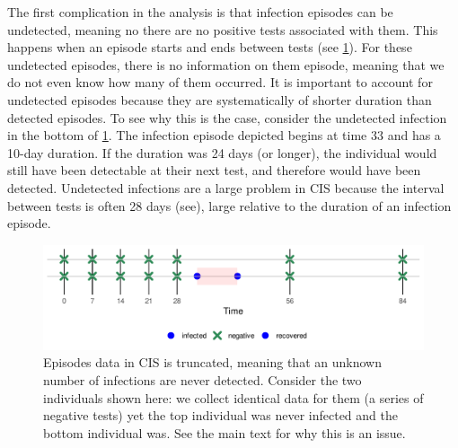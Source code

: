 \documentclass[thesis.tex]{subfiles}
\begin{document}
The first complication in the analysis is that infection episodes can be undetected, meaning no there are no positive tests associated with them.
This happens when an episode starts and ends between tests (see \cref{perf-test:fig:truncation}).
For these undetected episodes, there is no information on them episode, meaning that we do not even know how many of them occurred.
It is important to account for undetected episodes because they are systematically of shorter duration than detected episodes.
To see why this is the case, consider the undetected infection in the bottom of \cref{perf-test:fig:truncation}.
The infection episode depicted begins at time 33 and has a 10-day duration.
If the duration was 24 days (or longer), the individual would still have been detectable at their next test, and therefore would have been detected.
Undetected infections are a large problem in CIS because the interval between tests is often 28 days (see), large relative to the duration of an infection episode.
\begin{figure}
  \centering \includegraphics{cis-perfect-testing/truncation}
  \caption[Truncation in CIS data]{Episodes data in CIS is truncated, meaning that an unknown number of infections are never detected. Consider the two individuals shown here: we collect identical data for them (a series of negative tests) yet the top individual was never infected and the bottom individual was. See the main text for why this is an issue. \label{perf-test:fig:truncation}}
\end{figure}
\end{document}
